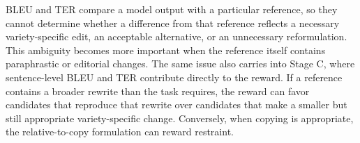 BLEU and TER compare a
model output with a particular reference, so they cannot determine whether a
difference from that reference reflects a necessary variety-specific edit, an
acceptable alternative, or an unnecessary reformulation. This ambiguity
becomes more important when the reference itself contains paraphrastic or
editorial changes. The same issue also carries into Stage C, where
sentence-level BLEU and TER contribute directly to the reward. If a reference
contains a broader rewrite than the task requires, the reward can favor
candidates that reproduce that rewrite over candidates that make a smaller but
still appropriate variety-specific change. Conversely, when copying is
appropriate, the relative-to-copy formulation can reward restraint.
